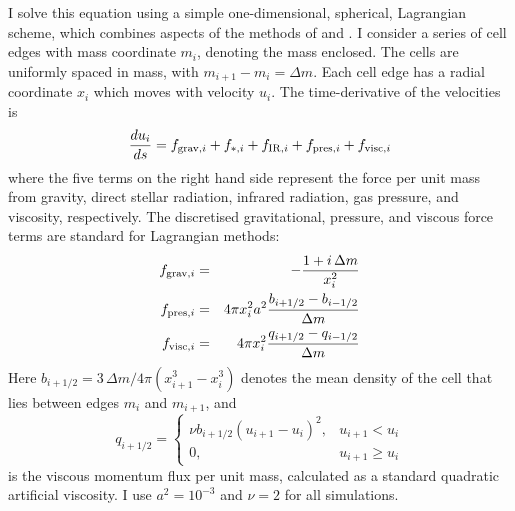 \documentclass[useAMS,usenatbib]{mn2e}
\begin{document}
I solve this equation using a simple one-dimensional, spherical, Lagrangian scheme, which combines aspects of the methods of \citet{cioffi88a} and \citet{mezzacappa93a}. I consider a series of cell edges with mass coordinate $m_i$, denoting the mass enclosed. The cells are uniformly spaced in mass, with $m_{i+1} - m_i = \Delta m$. Each cell edge has a radial coordinate $x_i$ which moves with velocity $u_i$. The time-derivative of the velocities is
\begin{equation}
\label{eq:eom_discrete}
\frac{du_i}{ds} = f_{{\rm grav},i} + f_{*,i} + f_{{\rm IR},i} + f_{{\rm pres},i} + f_{{\rm visc},i}
\end{equation}
where the five terms on the right hand side represent the force per unit mass from gravity, direct stellar radiation, infrared radiation, gas pressure, and viscosity, respectively. The discretised gravitational, pressure, and viscous force terms are standard for Lagrangian methods:
\begin{eqnarray}
f_{{\rm grav},i} & = & -\frac{1 + i\,\Delta m}{x_i^2} \\
f_{{\rm pres},i} & = & 4\pi x_i^2 a^2 \frac{b_{i+1/2} - b_{i-1/2}}{\Delta m} \\
f_{{\rm visc},i} & = & 4\pi x_i^2 \frac{q_{i+1/2}-q_{i-1/2}}{\Delta m}
\end{eqnarray}
Here $b_{i+1/2} = 3\, \Delta m/4\pi(x_{i+1}^3-x_{i}^3)$ denotes the mean density of the cell that lies between edges $m_i$ and $m_{i+1}$, and
\begin{equation}
q_{i+1/2} = 
\left\{
\begin{array}{ll}
\nu b_{i+1/2} \left(u_{i+1} - u_i\right)^2, & u_{i+1} < u_i \\
0, & u_{i+1} \geq u_i
\end{array}
\right.
\end{equation}
is the viscous momentum flux per unit mass, calculated as a standard \citet{von-neumann50a} quadratic artificial viscosity. I use $a^2 = 10^{-3}$ and $\nu=2$ for all simulations.
\end{document}

